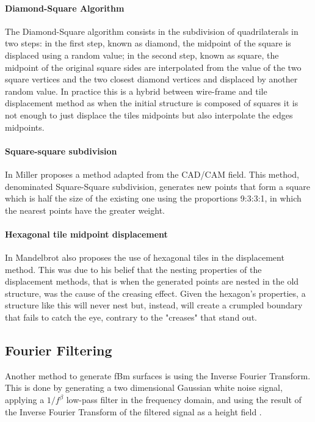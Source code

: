 \paragraph{Diamond-Square Algorithm}
The Diamond-Square algorithm \cite{Fournier1982} consists in the subdivision of quadrilaterals in two steps: in the first step, known as diamond, the midpoint of the square is displaced using a random value; in the second step, known as square, the midpoint of the original square sides are interpolated from the value of the two square vertices and the two closest diamond vertices and displaced by another random value. In practice this is a hybrid between wire-frame and tile displacement method as when the initial structure is composed of squares it is not enough to just displace the tiles midpoints but also interpolate the edges midpoints.


\paragraph{Square-square subdivision}
In \cite{Miller1986} Miller proposes a method adapted from the CAD/CAM field. This method, denominated Square-Square subdivision, generates new points that form a square which is half the size of the existing one using the proportions 9:3:3:1, in which the nearest points have the greater weight. 


\paragraph{Hexagonal tile midpoint displacement}
In \cite{Mandelbrot1988} Mandelbrot also proposes the use of hexagonal tiles in the displacement method. This was due to his belief that the nesting properties of the displacement methods, that is when the generated points are nested in the old structure, was the cause of the creasing effect. Given the hexagon's properties, a structure like this will never nest but, instead, will create a crumpled boundary that fails to catch the eye, contrary to the "creases" that stand out.


\subsection{Fourier Filtering}

Another method to generate fBm surfaces is using the Inverse Fourier Transform. This is done by generating a two dimensional Gaussian white noise signal, applying a $1/f^\beta$ low-pass filter in the frequency domain, and using the result of the Inverse Fourier Transform of the filtered signal as a height field \cite{Musgrave1989}. %


